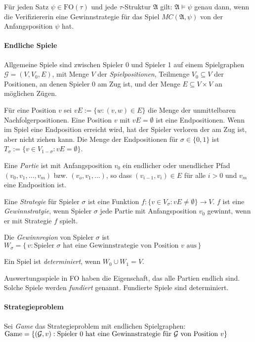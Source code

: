 \documentclass[a4paper,parskip=half*,DIV=15,fontsize=11pt]{scrartcl}
\newcommand{\A}{\mathfrak{A}}
\newcommand{\FO}{\mathrm{FO}}
\begin{document}
Für jeden Satz $\psi \in \FO(\tau)$ und jede $\tau$-Struktur $\A$ gilt: $\A \models \psi$ genau dann, wenn die Verifiziererin eine Gewinnstrategie für das Spiel $MC(\A,\psi)$ von der Anfangsposition $\psi$ hat.

\paragraph{Endliche Spiele} Allgemeine Spiele sind zwischen Spieler 0 und Spieler 1 auf einem Spielgraphen $\mathcal{G}=(V,V_0,E)$, mit Menge $V$ der \emph{Spielpositionen}, Teilmenge $V_0 \subseteq V$ der Positionen, an denen Spieler 0 am Zug ist, und der Menge $E \subseteq V \times V$ an möglichen Zügen.

Für eine Position $v$ sei $vE:=\{w:(v,w)\in E\}$ die Menge der unmittelbaren Nachfolgerpositionen. Eine Position $v$ mit $vE=\emptyset$ ist eine Endpositionen. Wenn im Spiel eine Endposition erreicht wird, hat der Spieler verloren der am Zug ist, aber nicht ziehen kann. Die Menge der Endpositionen für $\sigma \in \{0,1\}$ ist $T_{\sigma}:=\{v \in V_{1-\sigma}:vE=\emptyset\}$.

Eine \emph{Partie} ist mit Anfangsposition $v_0$ ein endlicher oder unendlicher Pfad $(v_0,v_1,\ldots,v_m)$ bzw. $(v_o,v_1,\ldots)$, so dass $(v_{i-1},v_i) \in E$ für alle $i>0$ und $v_m$ eine Endposition ist.

Eine \emph{Strategie} für Spieler $\sigma$ ist eine Funktion $f:\{v \in V_{\sigma}:vE \ne \emptyset \}\rightarrow V$. $f$ ist eine \emph{Gewinnstratgie}, wenn Spieler $\sigma$ jede Partie mit Anfangsposition $v_0$ gewinnt, wenn er mit Strategie $f$ spielt.

Die \emph{Gewinnregion} von Spieler $\sigma$ ist $W_{\sigma}=\{\,v:\text{Spieler $\sigma$ hat eine Gewinnstrategie von Position $v$ aus}\,\}$

Ein Spiel ist \emph{determiniert}, wenn $W_0 \cup W_1=V$.

Auswertungsspiele in FO haben die Eigenschaft, das alle Partien endlich sind. Solche Spiele werden \emph{fundiert} genannt. Fundierte Spiele sind determiniert.

\paragraph{Strategieproblem}
Sei \emph{Game} das Strategieproblem mit endlichen Spielgraphen:
$\mathrm{Game}=\{(\mathcal{G},v):\textnormal{Spieler }0\textnormal{ hat eine Gewinnstrategie für }\mathcal{G}\textnormal{ von Position }v\}$
\end{document}
